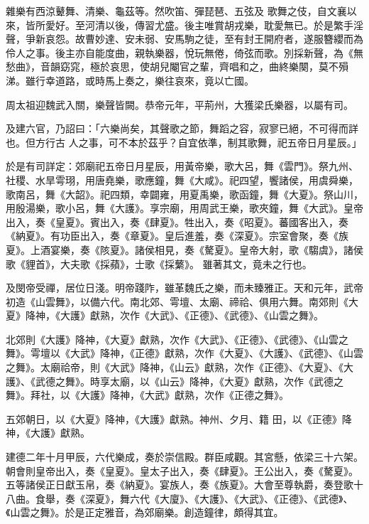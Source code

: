 \begin{pinyinscope}
 雜樂有西涼鼙舞、清樂、龜茲等。然吹笛、彈琵琶、五弦及
 歌舞之伎，自文襄以來，皆所愛好。至河清以後，傳習尤盛。後主唯賞胡戎樂，耽愛無已。於是繁手淫聲，爭新哀怨。故曹妙達、安未弱、安馬駒之徒，至有封王開府者，遂服簪纓而為伶人之事。後主亦自能度曲，親執樂器，悅玩無倦，倚弦而歌。別採新聲，為《無愁曲》，音韻窈窕，極於哀思，使胡兒閹官之輩，齊唱和之，曲終樂闋，莫不殞涕。雖行幸道路，或時馬上奏之，樂往哀來，竟以亡國。



 周太祖迎魏武入關，樂聲皆闕。恭帝元年，平荊州，大獲梁氏樂器，以屬有司。



 及建六官，乃詔曰：「六樂尚矣，其聲歌之節，舞蹈之容，寂寥已絕，不可得而詳也。但方行古
 人之事，可不本於茲乎？自宜依準，制其歌舞，祀五帝日月星辰。」



 於是有司詳定：郊廟祀五帝日月星辰，用黃帝樂，歌大呂，舞《雲門》。祭九州、社稷、水旱雩珝，用唐堯樂，歌應鐘，舞《大咸》。祀四望，饗諸侯，用虞舜樂，歌南呂，舞《大韶》。祀四類，幸闢雍，用夏禹樂，歌函鐘，舞《大夏》。祭山川，用殷湯樂，歌小呂，舞《大護》。享宗廟，用周武王樂，歌夾鐘，舞《大武》。皇帝出入，奏《皇夏》。賓出入，奏《肆夏》。牲出入，奏《昭夏》。蕃國客出入，奏《納夏》。有功臣出入，奏《章夏》。皇后進羞，奏《深夏》。宗室會聚，奏《族夏》。上酒宴樂，奏《陔夏》。諸侯相見，奏《驁夏》。皇帝大射，歌《騶虞》，諸侯歌《貍首》，大夫歌《採蘋》，士歌《採蘩》。
 雖著其文，竟未之行也。



 及閔帝受禪，居位日淺。明帝踐阼，雖革魏氏之樂，而未臻雅正。天和元年，武帝初造《山雲舞》，以備六代。南北郊、雩壇、太廟、禘祫、俱用六舞。南郊則《大夏》降神，《大護》獻熟，次作《大武》、《正德》、《武德》、《山雲之舞》。



 北郊則《大護》降神，《大夏》獻熟，次作《大武》、《正德》、《武德》、《山雲之舞》。雩壇以《大武》降神，《正德》獻熟，次作《大夏》、《大護》、《武德》、《山雲之舞》。太廟祫帝，則《大武》降神，《山云》獻熟，次作《正德》、《大夏》、《大護》、《武德之舞》。時享太廟，以《山云》降神，《大夏》獻熟，次作《武德之舞》。拜社，以《大護》降神，《大武》獻熟，次作《正德之舞》。



 五郊朝日，以《大夏》降神，《大護》獻熟。神州、夕月、籍
 田，以《正德》降神，《大護》獻熟。



 建德二年十月甲辰，六代樂成，奏於崇信殿。群臣咸觀。其宮懸，依梁三十六架。朝會則皇帝出入，奏《皇夏》。皇太子出入，奏《肆夏》。王公出入，奏《驁夏》。五等諸侯正日獻玉帛，奏《納夏》。宴族人，奏《族夏》。大會至尊執爵，奏登歌十八曲。食舉，奏《深夏》，舞六代《大廈》、《大護》、《大武》、《正德》、《武德》、《山雲之舞》。於是正定雅音，為郊廟樂。創造鐘律，頗得其宜。




\end{pinyinscope}

